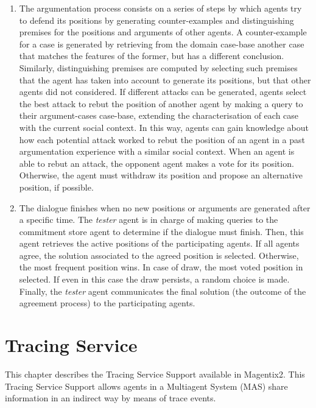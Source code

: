 \begin{enumerate}
 \item The argumentation process consists on a series of steps by which agents try to defend its positions by generating counter-examples and distinguishing premises for the positions and arguments of other agents. A counter-example for a case is generated by retrieving from the domain case-base another case that matches the features of the former, but has a different conclusion. Similarly, distinguishing premises are computed by selecting such premises that the agent has taken into account to generate its positions, but that other agents did not considered. If different attacks can be generated, agents select the best attack to rebut the position of another agent by making a query to their argument-cases case-base, extending the characterisation of each case with the current social context. In this way, agents can gain knowledge about how each potential attack worked to rebut the position of an agent in a past argumentation experience with a similar social context. When an agent is able to rebut an attack, the opponent agent makes a vote for its position. Otherwise, the agent must withdraw its position and propose an alternative position, if possible.
 \item The dialogue finishes when no new positions or arguments are generated after a specific time. The \emph{tester} agent is in charge of making queries to the commitment store agent to determine if the dialogue must finish. Then, this agent retrieves the active positions of the participating agents. If all agents agree, the solution associated to the agreed position is selected. Otherwise, the most frequent position wins. In case of draw, the most voted position in selected. If even in this case the draw persists, a random choice is made. Finally, the \emph{tester} agent communicates the final solution (the outcome of the agreement process) to the participating agents.
 \end{enumerate}







\chapter{Tracing Service}
\label{sec:tracingService}
	This chapter describes the Tracing Service Support available in Magentix2.
	This Tracing Service Support allows agents in a Multiagent System (MAS) share information in an
	indirect way by means of trace events.


